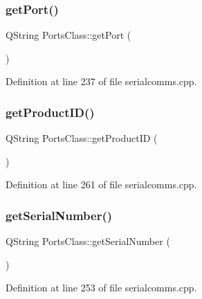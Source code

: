 \mbox{\label{class_ports_class_a0aba12c54c3293a67b28bfc1835b0fd6}} 
\subsubsection{\texorpdfstring{getPort()}{getPort()}}
{\footnotesize\ttfamily Q\+String Ports\+Class\+::get\+Port (\begin{DoxyParamCaption}{ }\end{DoxyParamCaption})}



Definition at line 237 of file serialcomms.\+cpp.

\mbox{\label{class_ports_class_a3f8207b8a5519b494aa8ae602019aa32}} 
\subsubsection{\texorpdfstring{getProductID()}{getProductID()}}
{\footnotesize\ttfamily Q\+String Ports\+Class\+::get\+Product\+ID (\begin{DoxyParamCaption}{ }\end{DoxyParamCaption})}



Definition at line 261 of file serialcomms.\+cpp.

\mbox{\label{class_ports_class_a0fad2da57c4cf364bda2389149844bf7}} 
\subsubsection{\texorpdfstring{getSerialNumber()}{getSerialNumber()}}
{\footnotesize\ttfamily Q\+String Ports\+Class\+::get\+Serial\+Number (\begin{DoxyParamCaption}{ }\end{DoxyParamCaption})}



Definition at line 253 of file serialcomms.\+cpp.

\mbox{\label{class_ports_class_ab855ef36f83175d9178d6c8fde0129cb}} 
